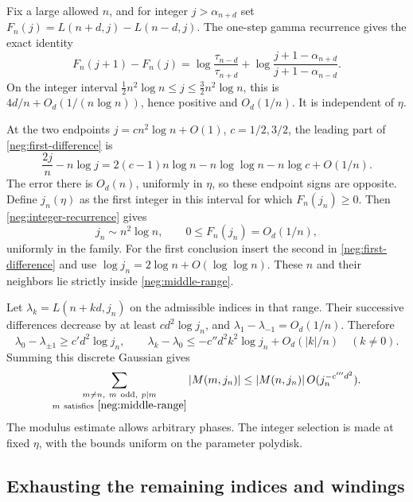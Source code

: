 \documentclass[11pt]{article}
\numberwithin{equation}{section}
\theoremstyle{definition}
\begin{document}
Fix a large allowed \(n\), and for integer \(j>\alpha_{n+d}\) set
\(F_n(j)=L(n+d,j)-L(n-d,j)\).  The one-step gamma recurrence
gives the exact identity
\begin{equation}
 F_n(j+1)-F_n(j)
  =\log\frac{\tau_{n-d}}{\tau_{n+d}}
       +\log\frac{j+1-\alpha_{n+d}}{j+1-\alpha_{n-d}}.
 \label{neg:integer-recurrence}
\end{equation}
On the integer interval
\(\tfrac12n^2\log n\le j\le\tfrac32n^2\log n\), this is
\(4d/n+O_d(1/(n\log n))\), hence positive and \(O_d(1/n)\).
It is independent of \(\eta\).

At the two endpoints \(j=cn^2\log n+O(1)\),
\(c=1/2,3/2\), the leading part of
\eqref{neg:first-difference} is
\[
 \frac{2j}{n}-n\log j
 =2(c-1)n\log n-n\log\log n-n\log c+O(1/n).
\]
The error there is \(O_d(n)\), uniformly in \(\eta\), so these
endpoint signs are opposite.  Define \(j_n(\eta)\) as the first
integer in this interval for which \(F_n(j_n)\ge0\).  Then
\eqref{neg:integer-recurrence} gives
\begin{equation}
 j_n\sim n^2\log n,\qquad
 0\le F_n(j_n)=O_d(1/n),
 \label{neg:selected-order}
\end{equation}
uniformly in the family.  For the first conclusion insert the
second in \eqref{neg:first-difference} and use
\(\log j_n=2\log n+O(\log\log n)\).  These \(n\) and their
neighbors lie strictly inside \eqref{neg:middle-range}.

Let \(\lambda_k=L(n+kd,j_n)\) on the admissible indices in that
range.  Their successive differences decrease by at least
\(cd^2\log j_n\), and
\(\lambda_1-\lambda_{-1}=O_d(1/n)\).  Therefore
\[
 \lambda_0-\lambda_{\pm1}\ge c'd^2\log j_n,\qquad
 \lambda_k-\lambda_0\le-c''d^2k^2\log j_n+O_d(|k|/n)
 \quad(k\ne0).
\]
Summing this discrete Gaussian gives
\begin{equation}
 \sum_{\substack{m\ne n,\ m\ {\rm odd},\ p\mid m\\
                       m\ {\rm satisfies}\ \eqref{neg:middle-range}}}
       |M(m,j_n)|
 \le |M(n,j_n)|\,O(j_n^{-c'''d^2}).
 \label{neg:single-index}
\end{equation}
The modulus estimate allows arbitrary phases. The integer selection
is made at fixed \(\eta\), with the bounds uniform on the
parameter polydisk.


\subsection{Exhausting the remaining indices and windings}
\label{neg:exhaustion}
\end{document}
